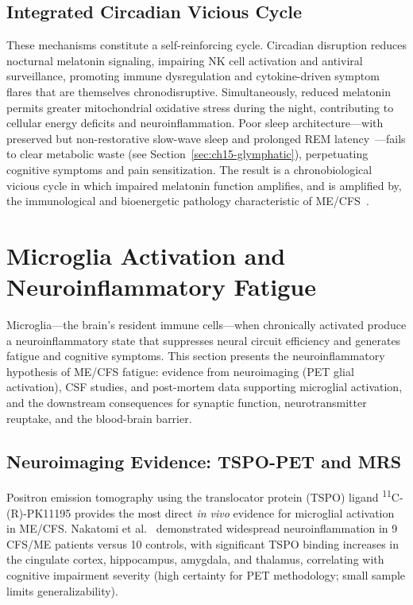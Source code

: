 \subsection{Integrated Circadian Vicious Cycle}

These mechanisms constitute a self-reinforcing cycle. Circadian disruption reduces nocturnal melatonin signaling, impairing NK cell activation and antiviral surveillance, promoting immune dysregulation and cytokine-driven symptom flares that are themselves chronodisruptive. Simultaneously, reduced melatonin permits greater mitochondrial oxidative stress during the night, contributing to cellular energy deficits and neuroinflammation. Poor sleep architecture---with preserved but non-restorative slow-wave sleep and prolonged REM latency~\cite{Mohamed2023sleep}---fails to clear metabolic waste (see Section~\ref{sec:ch15-glymphatic}), perpetuating cognitive symptoms and pain sensitization. The result is a chronobiological vicious cycle in which impaired melatonin function amplifies, and is amplified by, the immunological and bioenergetic pathology characteristic of ME/CFS~\cite{Anderson2020mitochondriaMECFS,McCarthy2022circadian}.


\section{Microglia Activation and Neuroinflammatory Fatigue}
\label{sec:ch15-microglia}

Microglia---the brain's resident immune cells---when chronically activated produce a neuroinflammatory state that suppresses neural circuit efficiency and generates fatigue and cognitive symptoms. This section presents the neuroinflammatory hypothesis of ME/CFS fatigue: evidence from neuroimaging (PET glial activation), CSF studies, and post-mortem data supporting microglial activation, and the downstream consequences for synaptic function, neurotransmitter reuptake, and the blood-brain barrier.

\subsection{Neuroimaging Evidence: TSPO-PET and MRS}

Positron emission tomography using the translocator protein (TSPO) ligand \textsuperscript{11}C-(R)-PK11195 provides the most direct \textit{in vivo} evidence for microglial activation in ME/CFS. Nakatomi et al.~\cite{Nakatomi2014Neuroinflammation} demonstrated widespread neuroinflammation in 9 CFS/ME patients versus 10 controls, with significant TSPO binding increases in the cingulate cortex, hippocampus, amygdala, and thalamus, correlating with cognitive impairment severity (high certainty for PET methodology; small sample limits generalizability).

